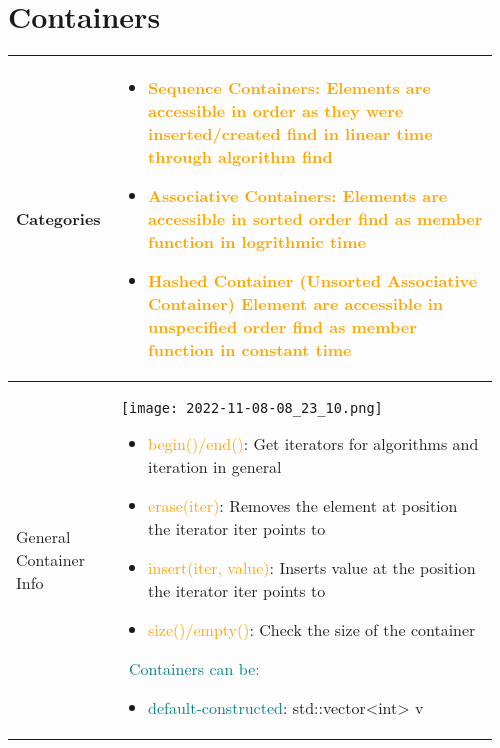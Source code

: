 \documentclass[main.tex,fontsize=8pt,paper=a4,paper=portrait,DIV=calc,]{scrartcl}
\begin{document}
\begin{table}[ht!]
\section{Containers}
\begin{tabular}{|m{0.2\linewidth}|m{0.755\linewidth}|}
\hline
Categories &
\vspace{2mm}
\begin{itemize}
\item \textcolor{orange}{Sequence Containers: \newline
  Elements are accessible in order as they were inserted/created\newline
  find in linear time through algorithm find}
\item \textcolor{orange}{Associative Containers:\newline
  Elements are accessible in sorted order\newline
  find as member function in logrithmic time}
\item \textcolor{orange}{Hashed Container (Unsorted Associative Container)\newline
  Element are accessible in unspecified order\newline
  find as member function in constant time}
\vspace{-2mm}
\end{itemize}\\ 
\hline
General Container Info &
\vspace{2mm}
\texttt{[image: 2022-11-08-08\_23\_10.png]}\newline
\begin{itemize}
\item \textcolor{orange}{begin()/end()}: Get iterators for algorithms and iteration in general
\item \textcolor{orange}{erase(iter)}: Removes the element at position the iterator iter points to
\item \textcolor{orange}{insert(iter, value)}: Inserts value at the position the iterator iter points to
\item \textcolor{orange}{size()/empty()}: Check the size of the container
\vspace{-2mm}
\end{itemize}
\, \newline
\textcolor{teal}{Containers can be:}\newline
\begin{itemize}
  \item \textcolor{teal}{default-constructed}: std::vector<int> v{}

\end{itemize}
\end{tabular}
\end{table}
\end{document}

